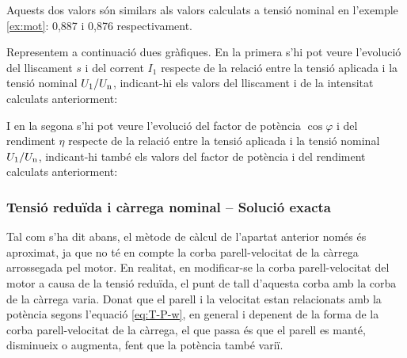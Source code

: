 \begin{exemple}
	Aquests dos valors són similars als valors calculats a tensió nominal en  l'exemple \ref{ex:mot}: 0,887 i 0,876 respectivament.
	
	Representem a continuació dues gràfiques. En la primera s'hi pot veure  l'evolució del lliscament $s$ i del corrent $I_1$ respecte de la relació entre la tensió aplicada i la tensió nominal $U_1/U_\mathrm{n}$, indicant-hi els valors del lliscament i de la intensitat calculats anteriorment:
	\begin{center}
		
	\end{center}

	I en la segona s'hi pot veure l'evolució del factor de potència $\cos\varphi$ i del rendiment $\eta$ respecte de la relació entre la tensió aplicada i la tensió nominal $U_1/U_\mathrm{n}$, indicant-hi també  els valors del factor de potència i del rendiment calculats anteriorment:
	\begin{center}
		
	\end{center}	
\end{exemple}

\subsubsection{Tensió reduïda i càrrega nominal -- Solució exacta}

Tal com s'ha dit abans, el mètode de càlcul de l'apartat anterior només és aproximat, ja que no té en compte la corba parell-velocitat de la càrrega arrossegada pel motor. En realitat, en modificar-se la corba parell-velocitat del motor a causa de la tensió reduïda, el punt de tall d'aquesta corba amb la corba de la càrrega varia. Donat que el parell i la velocitat estan relacionats amb la potència segons l'equació  \eqref{eq:T-P-w}, en general i depenent de la forma de la corba parell-velocitat de la càrrega, el que passa és que el parell es manté,  disminueix o augmenta, fent que la potència també variï.

